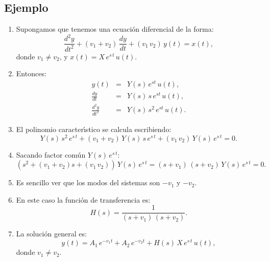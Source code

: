 \documentclass[11pt,a4paper,openany]{book}
\begin{document}
\subsection{Ejemplo}

\begin{enumerate}
	\item Supongamos que tenemos una ecuaci\'{o}n diferencial de la forma:
	\begin{equation}
		\frac{d^{2}y}{dt^{2}} + (v_{1} + v_{2}) \, \frac{dy}{dt} + (v_{1} \, v_{2}) \, y(t) = x(t), 
	\end{equation}
	donde $v_{1} \neq v_{2}$, y $x(t) = X \, e^{s \, t} \, u(t)$.
	
	\item Entonces: 
	\begin{eqnarray}
		y(t) &=& Y(s) \, e^{s t} \, u(t),               \\
		\frac{dy}{dt} &=& Y(s) \, s \, e^{s t}  \, u(t), \\  
		\frac{d^{2}y}{dt^{2}} &=& Y(s) \, s^{2} \, e^{s t} \, u(t).
	\end{eqnarray}
	
	\item El polinomio caracter\'{\i}stico se calcula escribiendo:
	\begin{equation}
		Y(s) \, s^{2} \, e^{s \, t} + (v_{1} + v_{2}) \, Y(s) \, s \, e^{s \, t} + (v_{1} \, v_{2}) \, Y(s) \, e^{s \, t} = 0.
	\end{equation}
	
	\item Sacando factor com\'{u}n $Y(s) \, e^{s \, t}$:
	\begin{equation}
		(s^{2}  + (v_{1} + v_{2}) s + (v_{1} \, v_{2})) \, Y(s) \, e^{s \, t} = (s + v_{1})\,(s + v_{2}) \, Y(s) \, e^{s \, t} = 0.
	\end{equation}
	
	\item Es sencillo ver que los modos del sistemas son $-v_{1}$ y $-v_{2}$.
	\item En este caso la funci\'{o}n de transferencia es:
	\begin{equation}
		H(s) = \frac{1}{(s + v_{1})\,(s + v_{2})}.
	\end{equation}
	
	\item La soluci\'{o}n general es:
	\begin{equation}
		y(t) = A_{1} \, e^{-v_{1} t} + A_{2} \, e^{-v_{2} t} + H(s) \, X \, e^{s \, t} \, u(t),
	\end{equation}
	donde $v_{1} \neq v_{2}$.
	

\end{enumerate}
\end{document}

